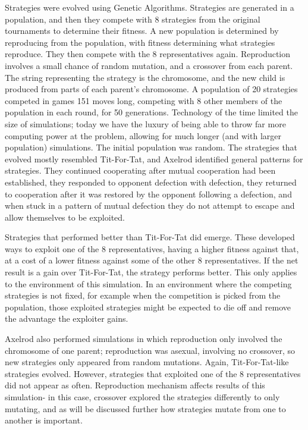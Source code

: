 \documentclass[a4paper,11pt,bcshonoursthesis,singlespace,twoside]{cssethesis}
\begin{document}
Strategies were evolved using Genetic Algorithms. Strategies are generated in a population, and then they compete with 8 strategies from the original tournaments to determine their fitness. A new population is determined by reproducing from the population, with fitness determining what strategies reproduce. They then compete with the 8 representatives again. 
Reproduction involves a small chance of random mutation, and a crossover from each parent. 
The string representing the strategy is the chromosome, and the new child is produced from parts of each parent's chromosome. A population of 20 strategies competed in games 151 moves long, competing with 8 other members of the population in each round, for 50 generations. 
Technology of the time limited the size of simulations; today we have the luxury of being able to throw far more computing power at the problem, allowing for much longer (and with larger population) simulations. 
The initial population was random. The strategies that evolved mostly resembled Tit-For-Tat, and Axelrod identified general patterns for strategies. They continued cooperating after mutual cooperation had been established, they responded to opponent defection with defection, they returned to cooperation after it was restored by the opponent following a defection, and when stuck in a pattern of mutual defection they do not attempt to escape and allow themselves to be exploited. 

Strategies that performed better than Tit-For-Tat did emerge. These developed ways to exploit one of the 8 representatives, having a higher fitness against that, at a cost of a lower fitness against some of the other 8 representatives. If the net result is a gain over Tit-For-Tat, the strategy performs better. 
This only applies to the environment of this simulation. 
In an environment where the competing strategies is not fixed, for example when the competition is picked from the population, those exploited strategies might be expected to die off and remove the advantage the exploiter gains. 

Axelrod also performed simulations in which reproduction only involved the chromosome of one parent; reproduction was asexual, involving no crossover, so new strategies only appeared from random mutations. 
Again, Tit-For-Tat-like strategies evolved. However, strategies that exploited one of the 8 representatives did not appear as often. Reproduction mechanism affects results of this simulation- in this case, crossover explored the strategies differently to only mutating, and as will be discussed further how strategies mutate from one to another is important. 
\end{document}
